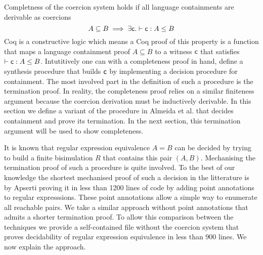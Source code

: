 


Completness of the coercion system holds if all language containments are derivable as coercions
\[ A \subseteq B \implies \exists \mathsf{c}.\vdash \mathsf{c} : A \leq B\]
Coq is a constructive logic which means a Coq proof of this property is a function that maps a language containment proof $A \subseteq B$ to a witness $\mathsf{c}$ that satisfies $\vdash \mathsf{c} : A \leq B$. Intutitively one can with a completeness proof in hand, define a synthesis procedure that builds $\mathsf{c}$ by implementing a decision procedure for containment. The most involved part in the definition of such a procedure is the termination proof. In reality, the completeness proof relies on a similar finiteness argument because the coercion derivation must be inductively derivable. In this section we define a variant of the procedure in Almeida et al. \cite{AMR09} that decides containment and prove its termination. In the next section, this termination argument will be used to show completeness.

It is known that regular expression equivalence $A = B$ can be decided by trying to build a finite bisimulation $R$ that contains this pair $(A,B)$. 
Mechanising the termination proof of such a procedure is quite involved. To the best of our knowledge the shortest mechanised proof of such a decision in the litterature is by Apserti \cite{A12} proving it in less than 1200 lines of code by adding point annotations to regular expresssions. These point annotations allow a simple way to enumerate all reachable pairs. We take a similar approach without point annotations that admits a shorter termination proof. To allow this comparison between the techniques we provide a self-contained file without the coercion system that proves decidability of regular expression equivalence in less than 900 lines. We now explain the approach.

